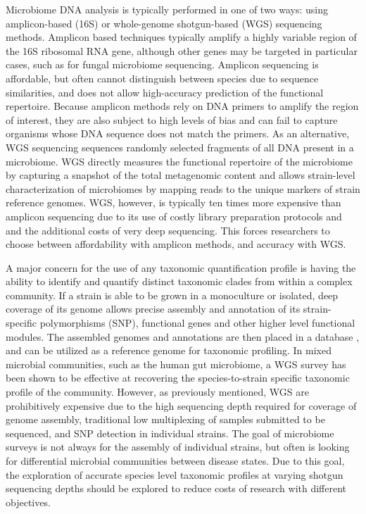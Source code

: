 \documentclass[conference,11pt]{IEEEtran}
\begin{document}
Microbiome DNA analysis is typically performed in one of two ways: using amplicon-based (16S) or whole-genome shotgun-based (WGS) sequencing methods. Amplicon based techniques typically amplify a highly variable region of the 16S ribosomal RNA gene, although other genes may be targeted in particular cases, such as for fungal microbiome sequencing. Amplicon sequencing is affordable, but often cannot distinguish between species due to sequence similarities, and does not allow high-accuracy prediction of the functional repertoire. Because amplicon methods rely on DNA primers to amplify the region of interest, they are also subject to high levels of bias and can fail to capture organisms whose DNA sequence does not match the primers. As an alternative, WGS sequencing sequences randomly selected fragments of all DNA present in a microbiome. WGS directly measures the functional repertoire of the microbiome by capturing a snapshot of the total metagenomic content and allows strain-level characterization of microbiomes by mapping reads to the unique markers of strain reference genomes. WGS, however, is typically ten times more expensive than amplicon sequencing due to its use of costly library preparation protocols and and the additional costs of very deep sequencing. This forces researchers to choose between affordability with amplicon methods, and accuracy with WGS.

A major concern for the use of any taxonomic quantification profile is having the ability to identify and quantify distinct taxonomic clades from within a complex community. If a strain is able to be grown in a monoculture or isolated, deep coverage of its genome allows precise assembly and annotation of its strain-specific polymorphisms (SNP), functional genes and other higher level functional modules. The assembled genomes and annotations are then placed in a database \cite{tatusova_refseq_2014}, and can be utilized as a reference genome for taxonomic profiling. In mixed microbial communities, such as the human gut microbiome, a WGS survey has been shown to be effective at recovering the species-to-strain specific taxonomic profile of the community. However, as previously mentioned, WGS are prohibitively expensive due to the high sequencing depth required for coverage of genome assembly, traditional low multiplexing of samples submitted to be sequenced, and SNP detection in individual strains. The goal of microbiome surveys is not always for the assembly of individual strains, but often is looking for differential microbial communities between disease states. Due to this goal, the exploration of accurate species level taxonomic profiles at varying shotgun sequencing depths should be explored to reduce costs of research with different objectives.
\end{document}
